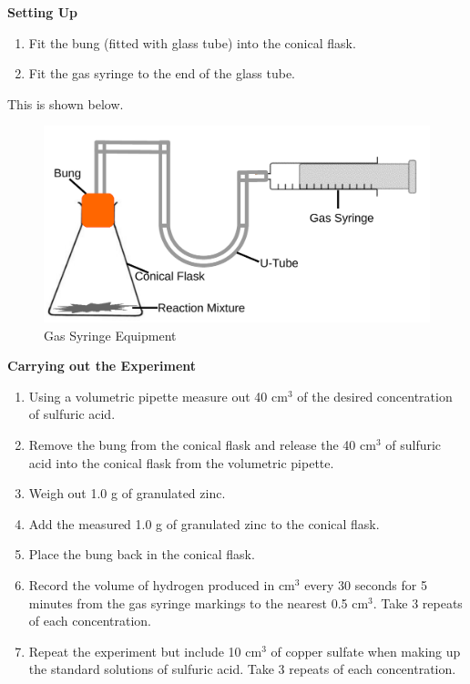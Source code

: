 \textbf{Setting Up}

\begin{enumerate}
\item Fit the bung (fitted with glass tube) into the conical flask.
\item Fit the gas syringe to the end of the glass tube.
\end{enumerate}


This is shown below.



\begin{figure}[H]
    \includegraphics[width=\textwidth]{./Planning/Images/GasSyringe.pdf}
    \caption{Gas Syringe Equipment} \label{fig:Gas Syringe}
\end{figure}

\textbf{Carrying out the Experiment}

\begin{enumerate}
\item Using a volumetric pipette measure out 40 cm$^3$ of the desired concentration of sulfuric acid.
\item Remove the bung from the conical flask and release the 40 cm$^3$ of sulfuric acid into the conical flask from the volumetric pipette.
\item Weigh out 1.0 g of granulated zinc.
\item Add the measured 1.0 g of granulated zinc to the conical flask.
\item Place the bung back in the conical flask.
\item Record the volume of hydrogen produced in cm$^3$ every 30 seconds for 5 minutes from the gas syringe markings to the nearest 0.5 cm$^3$. Take 3 repeats of each concentration.
\item Repeat the experiment but include 10 cm$^3$ of copper sulfate when making up the standard solutions of sulfuric acid. Take 3 repeats of each concentration.
\end{enumerate} 

